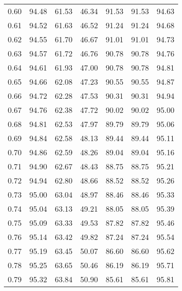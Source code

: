 \begin{tabular}{|c|c|c|c|c|c|c|}
      0.60 &     94.48 &     61.53 &      46.34 &   91.53 &      91.53 &         94.63 \\
      0.61 &     94.52 &     61.63 &      46.52 &   91.24 &      91.24 &         94.68 \\
      0.62 &     94.55 &     61.70 &      46.67 &   91.01 &      91.01 &         94.73 \\
      0.63 &     94.57 &     61.72 &      46.76 &   90.78 &      90.78 &         94.76 \\
      0.64 &     94.61 &     61.93 &      47.00 &   90.78 &      90.78 &         94.81 \\
      0.65 &     94.66 &     62.08 &      47.23 &   90.55 &      90.55 &         94.87 \\
      0.66 &     94.72 &     62.28 &      47.53 &   90.31 &      90.31 &         94.94 \\
      0.67 &     94.76 &     62.38 &      47.72 &   90.02 &      90.02 &         95.00 \\
      0.68 &     94.81 &     62.53 &      47.97 &   89.79 &      89.79 &         95.06 \\
      0.69 &     94.84 &     62.58 &      48.13 &   89.44 &      89.44 &         95.11 \\
      0.70 &     94.86 &     62.59 &      48.26 &   89.04 &      89.04 &         95.16 \\
      0.71 &     94.90 &     62.67 &      48.43 &   88.75 &      88.75 &         95.21 \\
      0.72 &     94.94 &     62.80 &      48.66 &   88.52 &      88.52 &         95.26 \\
      0.73 &     95.00 &     63.04 &      48.97 &   88.46 &      88.46 &         95.33 \\
      0.74 &     95.04 &     63.13 &      49.21 &   88.05 &      88.05 &         95.39 \\
      0.75 &     95.09 &     63.33 &      49.53 &   87.82 &      87.82 &         95.46 \\
      0.76 &     95.14 &     63.42 &      49.82 &   87.24 &      87.24 &         95.54 \\
      0.77 &     95.19 &     63.45 &      50.07 &   86.60 &      86.60 &         95.62 \\
      0.78 &     95.25 &     63.65 &      50.46 &   86.19 &      86.19 &         95.71 \\
      0.79 &     95.32 &     63.84 &      50.90 &   85.61 &      85.61 &         95.81 \\

\end{tabular}
